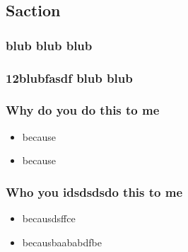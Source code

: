 \documentclass{beamer}
\begin{document}
        \subsection{Saction}
            \begin{frame}
                \frametitle{blub blub blub}
            \end{frame}
            \begin{frame}
                \frametitle{12blubfasdf blub blub}
            \end{frame}
        \begin{frame}
            \frametitle{Why do you do this to me}
            \begin{itemize}
                \item because
                \item because
            \end{itemize}
        \end{frame}
        \begin{frame}
            \frametitle{Who you idsdsdsdo this to me}
            \begin{itemize}
                \item becausdsffce
                \item becausbaababdfbe
            \end{itemize}
        \end{frame}
\end{document}
